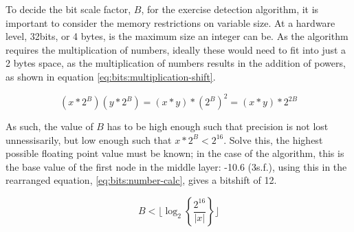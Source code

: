 To decide the bit scale factor, $B$, for the exercise detection algorithm, it is important to consider the memory restrictions on variable size. At a hardware level, 32bits, or 4 bytes, is the maximum size an integer can be. As the algorithm requires the multiplication of numbers, ideally these would need to fit into just a 2 bytes space, as the multiplication of numbers results in the addition of powers, as shown in equation \ref{eq:bits:multiplication-shift}.

\begin{equation}
\label{eq:bits:multiplication-shift}
(x*2^B)(y*2^B)=(x*y)*(2^B)^2=(x*y)*2^{2B}
\end{equation}

As such, the value of $B$ has to be high enough such that precision is not lost unnessisarily, but low enough such that $x*2^B<2^{16}$. Solve this, the highest possible floating point value must be known; in the case of the algorithm, this is the base value of the first node in the middle layer: -10.6 (3s.f.), using this in the rearranged equation, \ref{eq:bits:number-calc}, gives a bitshift of 12.

\begin{equation}
\label{eq:bits:number-calc}
B<\lfloor\log_{2}\left\{\frac{2^{16}}{|x|}\right\}\rfloor
\end{equation}